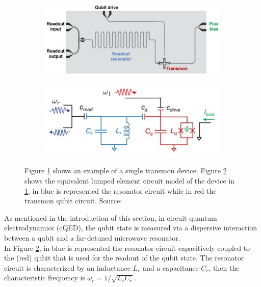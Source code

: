 \begin{figure}[h!]
    \centering
    \begin{subfigure}{0.47\textwidth}
        \centering
        \includegraphics[width=\textwidth]{figures/png/TransmonBoard.png}
        \subcaption{}
        \label{fig:TransmonBoard}
    \end{subfigure}
    \hfill
    \begin{subfigure}{0.47\textwidth}
        \centering
        \includegraphics[width=\textwidth]{figures/png/TransmonCircuit.png}
        \subcaption{}
        \label{fig:TransmonCircuit}
    \end{subfigure}
    \caption{Figure \ref{fig:TransmonBoard} shows an example of a single transmon device. Figure \ref{fig:TransmonCircuit} shows the equivalent lumped element circuit model of the device in \ref{fig:TransmonBoard}, in blue is represented the resonator circuit while in red the transmon qubit circuit. Source: \cite{Roth_2023}}
    \label{fig:Transmon_model}
\end{figure}

As mentioned in the introduction of this section, in circuit quantum electrodynamics (cQED), the qubit state is measured via a dispersive interaction between a qubit and a far-detuned microwave resonator.\\
In Figure \ref{fig:TransmonCircuit}, in blue is represented the resonator circuit capacitively coupled to the (red) qubit that is used for the readout of the qubit state. 
The resonator circuit is characterized by an inductance $L_r$ and a capacitance $C_r$, then the characteristic frequency is $\omega_r =  1/\sqrt{L_r C_r}$. 

